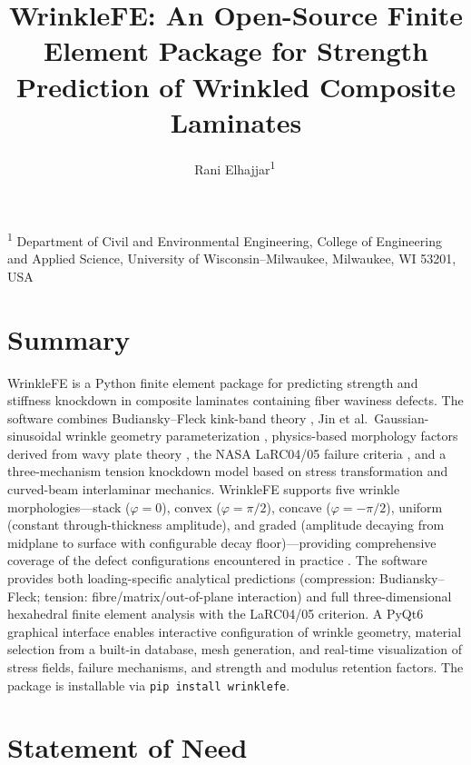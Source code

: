 \documentclass[10pt,a4paper]{article}
\title{WrinkleFE: An Open-Source Finite Element Package for Strength Prediction of Wrinkled Composite Laminates}
\author{Rani Elhajjar\textsuperscript{1}\,\orcidlink{0000-0003-4778-5186}}
\date{}
\begin{document}
\maketitle

\noindent\textsuperscript{1} Department of Civil and Environmental Engineering, College of Engineering and Applied Science, University of Wisconsin--Milwaukee, Milwaukee, WI 53201, USA

\bigskip

\section*{Summary}

WrinkleFE is a Python finite element package for predicting strength and stiffness knockdown in composite laminates containing fiber waviness defects.
The software combines Budiansky--Fleck kink-band theory \citep{BudianskyFleck1993}, Jin et al.\ Gaussian-sinusoidal wrinkle geometry parameterization \citep{Jin2026}, physics-based morphology factors derived from wavy plate theory \citep{Timoshenko1959}, the NASA LaRC04/05 failure criteria \citep{Pinho2005,DavilaCamanho2005}, and a three-mechanism tension knockdown model based on stress transformation and curved-beam interlaminar mechanics.
WrinkleFE supports five wrinkle morphologies---stack ($\varphi=0$), convex ($\varphi=\pi/2$), concave ($\varphi=-\pi/2$), uniform (constant through-thickness amplitude), and graded (amplitude decaying from midplane to surface with configurable decay floor)---providing comprehensive coverage of the defect configurations encountered in practice \citep{EllHajjar2023}.
The software provides both loading-specific analytical predictions (compression: Budiansky--Fleck; tension: fibre/matrix/out-of-plane interaction) and full three-dimensional hexahedral finite element analysis with the LaRC04/05 criterion.
A PyQt6 graphical interface enables interactive configuration of wrinkle geometry, material selection from a built-in database, mesh generation, and real-time visualization of stress fields, failure mechanisms, and strength and modulus retention factors.
The package is installable via \texttt{pip install wrinklefe}.

\section*{Statement of Need}
\end{document}
